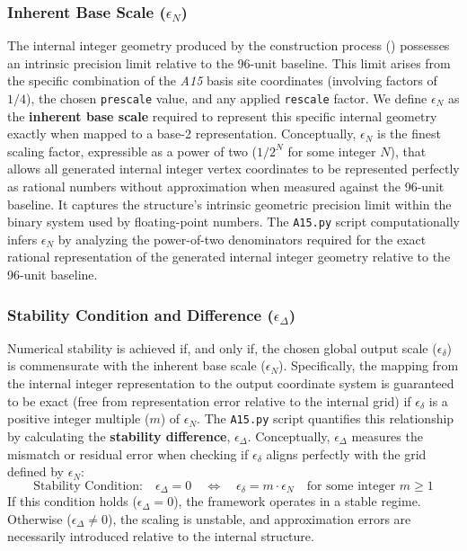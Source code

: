 \documentclass[10pt]{article}
\def\AAAB{\textit{A15}}
\begin{document}
\subsubsection{Inherent Base Scale ($\epsilon_N$)}\label{subsubsec:stability-epsilon-n}
The internal integer geometry produced by the construction process () possesses an intrinsic precision limit relative to the 96-unit baseline. This limit arises from the specific combination of the \AAAB{} basis site coordinates (involving factors of $1/4$), the chosen \texttt{prescale} value, and any applied \texttt{rescale} factor. We define $\epsilon_N$ as the \textbf{inherent base scale} required to represent this specific internal geometry exactly when mapped to a base-2 representation. Conceptually, $\epsilon_N$ is the finest scaling factor, expressible as a power of two ($1/2^N$ for some integer $N$), that allows all generated internal integer vertex coordinates to be represented perfectly as rational numbers without approximation when measured against the 96-unit baseline. It captures the structure's intrinsic geometric precision limit within the binary system used by floating-point numbers. The \texttt{A15.py} script computationally infers $\epsilon_N$ by analyzing the power-of-two denominators required for the exact rational representation of the generated internal integer geometry relative to the 96-unit baseline.

\subsubsection{Stability Condition and Difference ($\epsilon_\Delta$)}\label{subsubsec:stability-diff}
Numerical stability is achieved if, and only if, the chosen global output scale ($\epsilon_\delta$) is commensurate with the inherent base scale ($\epsilon_N$). Specifically, the mapping from the internal integer representation to the output coordinate system is guaranteed to be exact (free from representation error relative to the internal grid) if $\epsilon_\delta$ is a positive integer multiple ($m$) of $\epsilon_N$. The \texttt{A15.py} script quantifies this relationship by calculating the \textbf{stability difference}, $\epsilon_\Delta$. Conceptually, $\epsilon_\Delta$ measures the mismatch or residual error when checking if $\epsilon_\delta$ aligns perfectly with the grid defined by $\epsilon_N$:
\begin{equation}\label{eq:stability-condition}
\text{Stability Condition:} \quad \epsilon_\Delta = 0 \quad \iff \quad \epsilon_\delta = m \cdot \epsilon_N \quad \text{for some integer } m \ge 1
\end{equation}
If this condition holds ($\epsilon_\Delta = 0$), the framework operates in a stable regime. Otherwise ($\epsilon_\Delta \neq 0$), the scaling is unstable, and approximation errors are necessarily introduced relative to the internal structure.
\end{document}
